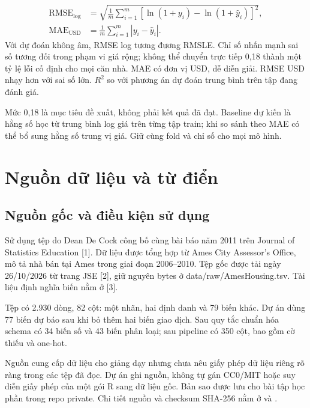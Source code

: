 \documentclass[12pt,a4paper]{article}
\begin{document}
\begin{align}
\mathrm{RMSE}_{\log}&=\sqrt{\frac{1}{m}\sum_{i=1}^{m}
 \left[\ln(1+y_i)-\ln(1+\widehat y_i)\right]^2},\\
\mathrm{MAE}_{\mathrm{USD}}&=\frac{1}{m}\sum_{i=1}^{m}|y_i-\widehat y_i|.
\end{align}
Với dự đoán không âm, RMSE log tương đương RMSLE. Chỉ số nhấn mạnh sai số
tương đối trong phạm vi giá rộng; không thể chuyển trực tiếp 0,18 thành một
tỷ lệ lỗi cố định cho mọi căn nhà. MAE có đơn vị USD, dễ diễn giải.
RMSE USD nhạy hơn với sai số lớn. $R^2$ so với phương án dự đoán trung bình
trên tập đang đánh giá.


Mức 0,18 là mục tiêu đề xuất, không phải kết quả đã đạt. Baseline dự kiến là hằng số học từ trung bình log giá trên từng tập train; khi so sánh theo MAE có thể bổ sung hằng số trung vị giá. Giữ cùng fold và chỉ số cho mọi mô hình.


\clearpage

\section{Nguồn dữ liệu và từ điển}

\subsection{Nguồn gốc và điều kiện sử dụng}

Sử dụng tệp  do Dean De Cock công bố cùng bài báo năm 2011 trên Journal of Statistics Education [1]. Dữ liệu được tổng hợp từ Ames City Assessor's Office, mô tả nhà bán tại Ames trong giai đoạn 2006–2010. Tệp gốc được tải ngày 26/10/2026 từ trang JSE [2], giữ nguyên bytes ở data/raw/AmesHousing.tsv. Tài liệu định nghĩa biến nằm ở  [3].


Tệp có 2.930 dòng, 82 cột: một nhãn, hai định danh và 79 biến khác. Dự án dùng 77 biến dự báo sau khi bỏ thêm hai biến giao dịch. Sau quy tắc chuẩn hóa schema có 34 biến số và 43 biến phân loại; sau pipeline có 350 cột, bao gồm cờ thiếu và one-hot.


Nguồn cung cấp dữ liệu cho giảng dạy nhưng chưa nêu giấy phép dữ liệu riêng rõ ràng trong các tệp đã đọc. Dự án ghi nguồn, không tự gán CC0/MIT hoặc suy diễn giấy phép của một gói R sang dữ liệu gốc. Bản sao được lưu cho bài tập học phần trong repo private. Chi tiết nguồn và checksum SHA-256 nằm ở  và .
\end{document}
